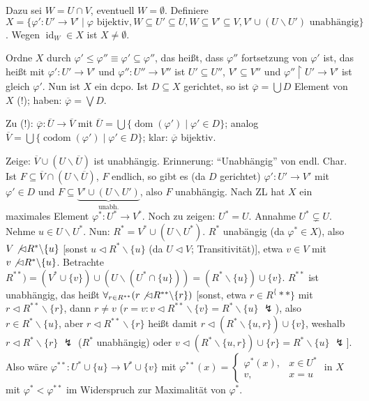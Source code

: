 \documentclass[headsepline=true,DIV=11]{scrartcl}
\theoremstyle{definition}
\renewcommand{\bar}[1]{\overline{#1}}
\newcommand{\dom}{\operatorname{dom}}
\newcommand{\codom}{\operatorname{codom}}
\begin{document}
Dazu sei $W=U\cap V$, eventuell $W=\emptyset$. Definiere $X=\{\varphi':U'\rightarrow V'\mid \varphi\mbox{ bijektiv}, W\subseteq U'\subseteq U,
W\subseteq V'\subseteq V, V'\cup(U\backslash U')\mbox{ unabhängig}\}$. Wegen $\operatorname{id}_W\in X$ ist $X\neq\emptyset$.

Ordne $X$ durch $\varphi'\le\varphi''\equiv \varphi'\subseteq\varphi''$, das heißt, dass $\varphi''$ fortsetzung von $\varphi'$ ist, das heißt mit
$\varphi':U'\rightarrow V'$ und $\varphi'':U''\rightarrow V''$ ist $U'\subseteq U''$, $V'\subseteq V''$ und $\varphi''\upharpoonright U'\rightarrow
V'$ ist gleich $\varphi'$. Nun ist $X$ ein dcpo. Ist $D\subseteq X$ gerichtet, so ist $\bar{\varphi}=\bigcup D$ Element von $X$ (!); haben: $\bar{\varphi}=\bigvee D$.

Zu (!): $\bar{\varphi}:\bar{U}\rightarrow\bar{V}$ mit $\bar{U}=\bigcup\{\dom(\varphi')\mid \varphi'\in D\}$; analog
$\bar{V}=\bigcup\{\codom(\varphi')\mid \varphi'\in D\}$; klar: $\bar{\varphi}$ bijektiv.

Zeige: $\bar{V}\cup(U\backslash\bar{U})$ ist unabhängig. Erinnerung: ``Unabhängig'' von endl. Char. Ist $F\subseteq \bar{V}\cap(U\backslash\bar{U})$,
$F$ endlich, so gibt es (da $D$ gerichtet) $\varphi':U'\rightarrow V'$ mit $\varphi'\in D$ und $F\subseteq \underbrace{V'\cup(U\backslash
  U')}_{\mbox{unabh.}}$, also $F$ unabhängig. Nach ZL hat $X$ ein maximales Element $\varphi^*:U^*\rightarrow V^*$. Noch zu zeigen: $U^*=U$. Annahme
$U^*\subsetneq U$. Nehme $u\in U\backslash U^*$. Nun: $R^*=V^*\cup(U\backslash U^*)$. $R^*$ unabängig (da $\varphi^*\in X$), also $V\not\lhd
R^*\backslash\{u\}$ [sonst $u\lhd R^*\backslash\{u\}$ (da $U\lhd V$; Transitivität)], etwa $v\in V$ mit $v\not\lhd R^*\backslash\{u\}$. Betrachte
$R^{**})=(V^*\cup\{v\})\cup(U\backslash(U^*\cap\{u\}))=(R^*\backslash\{u\})\cup\{v\}$. $R^{**}$ ist unabhängig, das heißt $\forall_{r\in
  R^{**}}(r\not\lhd R^{**}\backslash\{r\})$ [sonst, etwa $r\in R^\{**\}$ mit $r\lhd R^{**}\backslash\{r\}$, dann $r\neq v$ ($r=v: v\lhd
  R^{**}\backslash\{v\}=R^*\backslash\{u\}$ $\lightning$), also $r\in R^*\backslash\{u\}$, aber $r\lhd R^{**}\backslash\{r\}$ heißt damit $r\lhd
  (R^*\backslash\{u,r\})\cup\{v\}$, weshalb $r\lhd R^*\backslash\{r\}$ $\lightning$ ($R^*$ unabhängig) oder
  $v\lhd(R^*\backslash\{u,r\})\cup\{r\}=R^*\backslash\{u\}$ $\lightning$]. Also wäre $\varphi^{**}:U^*\cup\{u\}\rightarrow V^*\cup\{v\}$ mit
$\varphi^{**}(x) = \left\{ \begin{array}{rl} \varphi^*(x),& x\in U^* \\ v,& x = u \end{array}\right.$ in $X$ mit $\varphi^* < \varphi^{**}$ im
Widerspruch zur Maximalität von $\varphi^*$.
\end{document}
